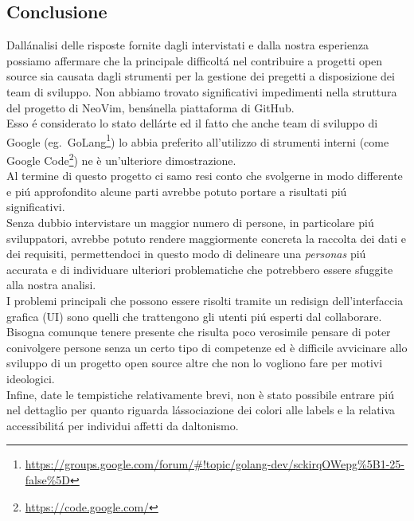 \documentclass[12pt]{article} %
\begin{document}
\subsection{Conclusione}
Dall\'analisi delle risposte fornite dagli intervistati e dalla nostra esperienza possiamo affermare che la principale difficolt\'a nel contribuire a progetti open source sia causata dagli strumenti per la gestione dei pregetti a disposizione dei team di sviluppo. Non abbiamo trovato significativi impedimenti nella struttura del progetto di NeoVim, bens\'\i nella piattaforma di GitHub.\\
Esso \'e considerato lo stato dell\'arte ed il fatto che anche team di sviluppo di Google (eg.\ GoLang\footnote{\url{https://groups.google.com/forum/#!topic/golang-dev/sckirqOWepg\%5B1-25-false\%5D}}) lo abbia preferito all'utilizzo di strumenti interni (come Google Code\footnote{\url{https://code.google.com/}}) ne \`e un'ulteriore dimostrazione.\\
Al termine di questo progetto ci samo resi conto che svolgerne in modo differente e pi\'u approfondito alcune parti avrebbe potuto portare a risultati pi\'u significativi.\\
Senza dubbio intervistare un maggior numero di persone, in particolare pi\'u sviluppatori, avrebbe potuto rendere maggiormente concreta la raccolta dei dati e dei requisiti, permettendoci in questo modo di delineare una \emph{personas} pi\'u accurata e di individuare ulteriori problematiche che potrebbero essere sfuggite alla nostra analisi.\\
I problemi principali che possono essere risolti tramite un redisign dell'interfaccia grafica (UI) sono quelli che trattengono gli utenti pi\'u esperti dal collaborare. Bisogna comunque tenere presente che risulta poco verosimile pensare di poter conivolgere persone senza un certo tipo di competenze ed \`e difficile avvicinare allo sviluppo di un progetto open source altre che non lo vogliono fare per motivi ideologici.\\
Infine, date le tempistiche relativamente brevi, non \`e stato possibile entrare pi\'u nel dettaglio per quanto riguarda l\'associazione dei colori alle labels e la relativa accessibilit\'a per individui affetti da daltonismo.


\newpage


\end{document}
